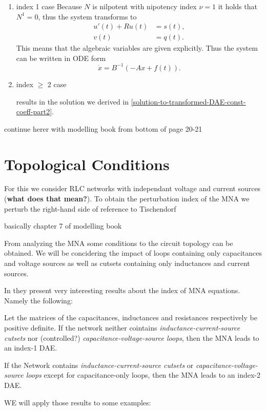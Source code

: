 \begin{enumerate}
	\item index 1 case
	Because $N$ is nilpotent with nipotency index $\nu = 1$ it holds that $N^1 = 0$, thus the system transforms to
	\begin{align*}
		u'(t) + Ru(t) &= s(t), \\
		v(t) &= q(t).
	\end{align*}
	This means that the algebraic variables are given explicitly. Thus the system can be written in ODE form
	\begin{displaymath}
		\dot{x}=B^{-1}(-Ax+f(t)).
	\end{displaymath}

	\item index $\geq$ 2 case
	
	results in the solution we derived in \ref{solution-to-transformed-DAE-const-coeff-part2}.
\end{enumerate}

continue herer with modelling book from bottom of page 20-21

\section{Topological Conditions}
For this we consider RLC networks with independant voltage and current sources (\textbf{what does that mean?}). To obtain the perturbation index of the MNA we perturb the right-hand side of  
\newline reference to Tischendorf



basically chapter 7 of modelling book

From analyzing the MNA some conditions to the circuit topology can be obtained. We will be concidering the impact of loops containing only capacitances and voltage sources as well as cutsets containing only inductances and current sources.

In \cite{Tischendorf2005Topological} they present very interesting results about the index of MNA equations. Namely the following:


\begin{theorem} \cite{Tischendorf2004Topological}
	Let the matrices of the capacitances, inductances and resistances respectively be positive definite. If the network neither cointains \emph{inductance-current-source cutsets} nor (controlled?) \emph{capacitance-voltage-source loops}, then the MNA leads to an index-1 DAE.
\end{theorem}

\begin{theorem} \cite{Tischendorf2004Topological}
	If the Network contains \emph{inductance-current-source cutsets} or \emph{capacitance-voltage-source loops} except for capacitance-only loops, then the MNA leads to an index-2 DAE.
\end{theorem}

WE will apply those results to some examples: